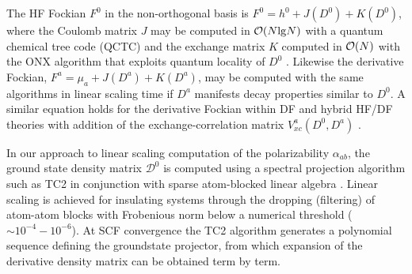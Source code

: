 \documentclass[prl,aps,preprint,showpacs,superbib]{revtex4}
\begin{document}
The HF Fockian $F^0$ in the non-orthogonal basis is $F^0=h^0+J(D^0)+K(D^0)$, where the Coulomb matrix $J$ may
be computed in ${\cal O}(N {\rm lg} N )$ with a quantum chemical tree code (QCTC) \cite{MChallacombe97} and the 
exchange matrix $K$ computed in ${\cal O}(N)$ with the ONX algorithm that exploits quantum locality  of $D^0$ \cite{ESchwegler97}.
Likewise the derivative Fockian, $F^a=\mu_a+J(D^a)+K(D^a)$, may be computed with the same algorithms in 
linear scaling time if $D^a$ manifests decay properties similar to $D^0$.  A similar equation holds for the derivative Fockian 
within DF and hybrid HF/DF theories with addition of the exchange-correlation 
matrix $V_{xc}^a(D^0,D^a)$ \cite{Lee_1994}.

In our approach to linear scaling computation of the polarizability $\alpha_{ab}$, the ground state 
density matrix $\mathcal{D}^0$ is computed using a spectral projection algorithm such 
as TC2 \cite{ANiklasson02A} in conjunction with sparse atom-blocked linear algebra \cite{ANiklasson03,MChallacombe00B}.  
Linear scaling is achieved for insulating systems through the dropping (filtering) of atom-atom 
blocks with Frobenious norm below a numerical threshold ($\sim 10^{-4}-10^{-6}$).
At SCF convergence the TC2 algorithm generates a polynomial sequence defining the groundstate projector, 
from which expansion of the derivative density matrix can be obtained term by term.
\end{document}
